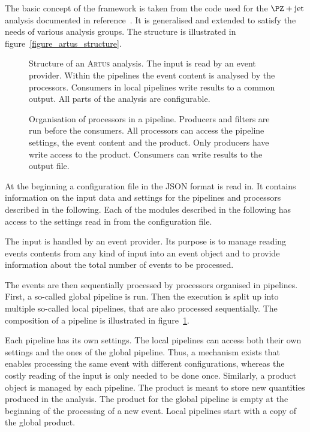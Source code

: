 \documentclass[3p]{elsarticle}
\newcommand{\software}[1]{\textsc{#1}\xspace}
\newcommand{\artus}{\software{Artus}}
\begin{document}
The basic concept of the framework is taken from the code used for the $\PZ+\text{jet}$ analysis documented in reference~\cite{joram_phd}. It is generalised and extended to satisfy the needs of various analysis groups. The structure is illustrated in figure~\ref{figure_artus_structure}.

\begin{figure}[p]
\centering 
\caption[Structure of an \artus analysis.]{Structure of an \artus analysis. The input is read by an event provider. Within the pipelines the event content is analysed by the processors. Consumers in local pipelines write results to a common output. All parts of the analysis are configurable.}
\label{figure_artus_structure}

\vspace{10ex}

\centering 
\caption[Organisation of processors in a pipeline.]{Organisation of processors in a pipeline. Producers and filters are run before the consumers. All processors can access the pipeline settings, the event content and the product. Only producers have write access to the product. Consumers can write results to the output file.}
\label{figure_artus_pipeline}
\end{figure}

At the beginning a configuration file in the JSON format is read in. It contains information on the input data and settings for the pipelines and processors described in the following. Each of the modules described in the following has access to the settings read in from the configuration file.

The input is handled by an event provider. Its purpose is to manage reading events contents from any kind of input into an event object and to provide information about the total number of events to be processed.

The events are then sequentially processed by processors organised in pipelines. First, a so-called global pipeline is run. Then the execution is split up into multiple so-called local pipelines, that are also processed sequentially. The composition of a pipeline is illustrated in figure~\ref{figure_artus_pipeline}.

Each pipeline has its own settings. The local pipelines can access both their own settings and the ones of the global pipeline. Thus, a mechanism exists that enables processing the same event with different configurations, whereas the costly reading of the input is only needed to be done once. Similarly, a product object is managed by each pipeline. The product is meant to store new quantities produced in the analysis. The product for the global pipeline is empty at the beginning of the processing of a new event. Local pipelines start with a copy of the global product.
\end{document}
